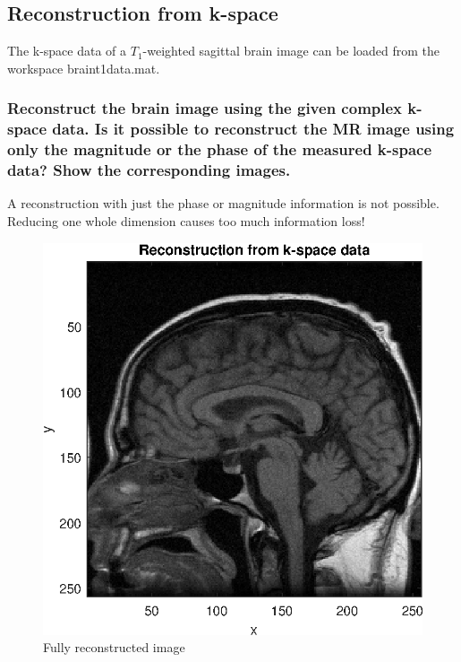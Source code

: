 \subsection{Reconstruction from k-space}
The k-space data of a $T_1$-weighted sagittal brain image can be loaded from the workspace
braint1data.mat.


\subsubsection{Reconstruct the brain image using the given complex k-space data. Is it possible to
reconstruct the MR image using only the magnitude or the phase of the measured k-space
data? Show the corresponding images.}
A reconstruction with just the phase or magnitude information is not possible. Reducing one whole dimension causes too much information loss!
\begin{figure}[h!]
    \centering
    \includegraphics[width=.8\linewidth]{./homework4/img/recon.eps}
    \caption{Fully reconstructed image}
    \label{fig:recon}
\end{figure}

